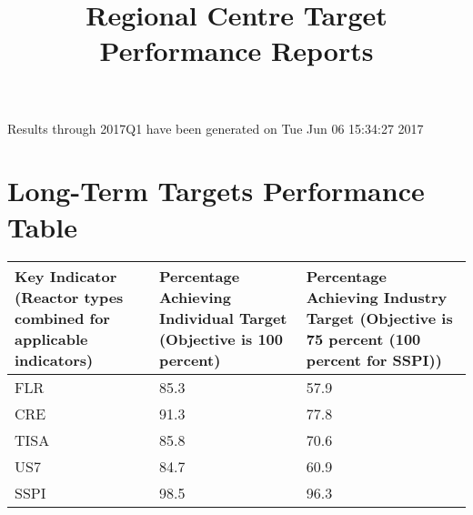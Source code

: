 \documentclass{article}
\begin{document}
\title{Regional Centre Target Performance Reports}








\begin{Schunk}
\begin{Soutput}
Results through 2017Q1 have been generated on Tue Jun 06 15:34:27 2017
\end{Soutput}
\end{Schunk}

\section*{Long-Term Targets Performance Table}
\begin{center}
\begin{tabular}{|p{5cm}||p{5cm}|p{5cm}|}
\hline

Key Indicator (Reactor types combined for applicable indicators) & Percentage Achieving Individual Target (Objective is 100 percent) & Percentage Achieving Industry Target (Objective is 75 percent (100 percent for SSPI)) \\
\hline\hline FLR & 85.3 & 57.9 \\
\hline 
CRE & 91.3 & 77.8 \\
\hline 
TISA & 85.8 & 70.6 \\
\hline 
US7 & 84.7 & 60.9 \\
\hline 
SSPI & 98.5 & 96.3 \\
\hline \end{tabular}
\end{center}
\end{document}
